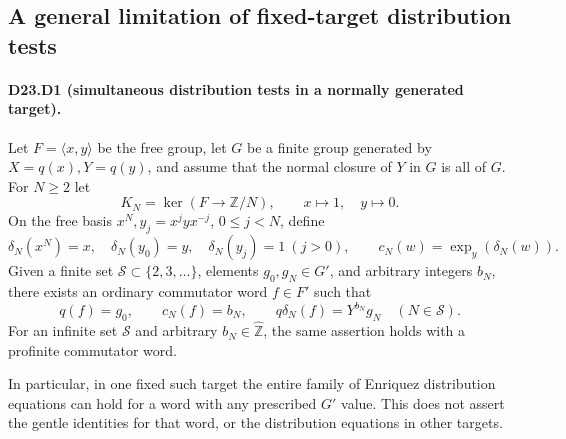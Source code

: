 \subsection{A general limitation of fixed-target distribution tests}

\paragraph{D23.D1 (simultaneous distribution tests in a normally generated target).}
Let $F=\langle x,y\rangle$ be the free group, let $G$ be a finite
group generated by $X=q(x),Y=q(y)$, and assume that the normal
closure of $Y$ in $G$ is all of $G$. For $N\ge2$ let
\[
 K_N=\ker(F\longrightarrow\mathbb Z/N),\qquad
 x\longmapsto1,\quad y\longmapsto0.
\]
On the free basis $x^N,y_j=x^jyx^{-j}$, $0\le j<N$, define
\[
 \delta_N(x^N)=x,\quad\delta_N(y_0)=y,\quad
 \delta_N(y_j)=1\ (j>0),\qquad
 c_N(w)=\operatorname{exp}_y(\delta_N(w)).
\]
Given a finite set $\mathcal S\subset\{2,3,\ldots\}$, elements
$g_0,g_N\in G'$, and arbitrary integers $b_N$, there exists an
ordinary commutator word $f\in F'$ such that
\[
 q(f)=g_0,\qquad c_N(f)=b_N,\qquad
 q\delta_N(f)=Y^{b_N}g_N\quad(N\in\mathcal S).
\tag{D23.D1.1}
\]
For an infinite set $\mathcal S$ and arbitrary $b_N\in\widehat{\mathbb Z}$,
the same assertion holds with a profinite commutator word.

In particular, in one fixed such target the entire family of
Enriquez distribution equations can hold for a word with any
prescribed $G'$ value. This does not assert the gentle identities
for that word, or the distribution equations in other targets.


